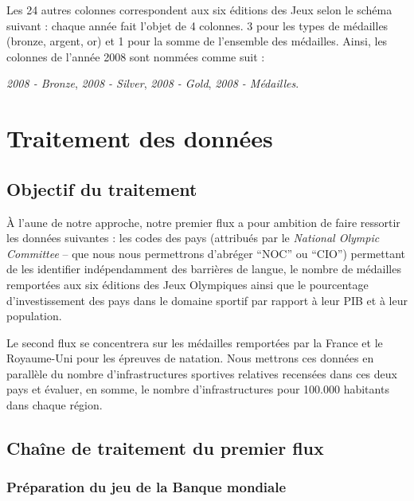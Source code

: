 \documentclass[hidelinks, 12pt]{report}
\begin{document}
Les 24 autres colonnes correspondent aux six éditions des Jeux selon le schéma suivant : chaque année fait l'objet de 4 colonnes. 3 pour les types de médailles (bronze, argent, or) et 1 pour la somme de l'ensemble des médailles. Ainsi, les colonnes de l'année 2008 sont nommées comme suit :

\textit{2008 - Bronze}, \textit{2008 - Silver}, \textit{2008 - Gold}, \textit{2008 - Médailles}.





%





\chapter{Traitement des données}

\section{Objectif du traitement}

À l'aune de notre approche, notre premier flux a pour ambition de faire ressortir les données suivantes : les codes des pays (attribués par le \textit{National Olympic Committee} -- que nous nous permettrons d'abréger \enquote{NOC} ou \enquote{CIO}) permettant de les identifier indépendamment des barrières de langue, le nombre de médailles remportées aux six éditions des Jeux Olympiques ainsi que le pourcentage d'investissement des pays dans le domaine sportif par rapport à leur PIB et à leur population.

Le second flux se concentrera sur les médailles remportées par la France et le Royaume-Uni pour les épreuves de natation. Nous mettrons ces données en parallèle du nombre d'infrastructures sportives relatives recensées dans ces deux pays et évaluer, en somme, le nombre d'infrastructures pour 100.000 habitants dans chaque région.





%





\section{Chaîne de traitement du premier flux}

\subsection{Préparation du jeu de la Banque mondiale}
\end{document}
